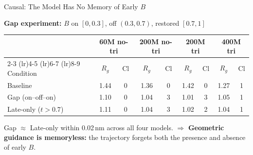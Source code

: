 \documentclass[10pt, aspectratio=169]{beamer}
\begin{document}
\begin{frame}{Causal: The Model Has No Memory of Early $B$}

\textbf{Gap experiment:} $B$ on $[0, 0.3]$, off $(0.3, 0.7)$, restored $[0.7, 1]$

\medskip
{\small
\begin{tabular}{lcccccccc}
    \toprule
    & \multicolumn{2}{c}{\textbf{60M no-tri}} & \multicolumn{2}{c}{\textbf{200M no-tri}} & \multicolumn{2}{c}{\textbf{200M tri}} & \multicolumn{2}{c}{\textbf{400M tri}} \\
    \cmidrule(lr){2-3} \cmidrule(lr){4-5} \cmidrule(lr){6-7} \cmidrule(lr){8-9}
    Condition & $R_g$ & Cl & $R_g$ & Cl & $R_g$ & Cl & $R_g$ & Cl \\
    \midrule
    Baseline & 1.44 & 0 & 1.36 & 0 & 1.42 & 0 & 1.27 & 1 \\
    \rowcolor{teal!10} Gap (on--off--on) & 1.10 & 0 & 1.04 & 3 & 1.01 & 3 & 1.05 & 1 \\
    \rowcolor{teal!10} Late-only ($t{>}0.7$) & 1.11 & 0 & 1.04 & 3 & 1.02 & 2 & 1.04 & 1 \\
    \bottomrule
\end{tabular}}

\bigskip
Gap $\approx$ Late-only within 0.02\,nm across all four models.
$\Rightarrow$ \textbf{Geometric guidance is memoryless:} the trajectory forgets both the presence and absence of early $B$.
\end{frame}
\end{document}
